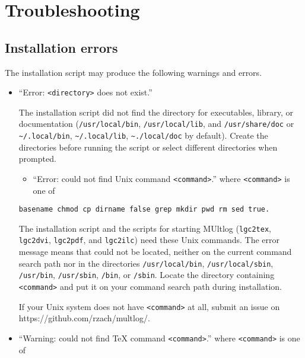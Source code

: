 \documentclass[]{article}
\providecommand{\tightlist}{%
  \setlength{\itemsep}{0pt}\setlength{\parskip}{0pt}}
\begin{document}
\hypertarget{troubleshooting}{%
\section{Troubleshooting}\label{troubleshooting}}

\hypertarget{installation-errors}{%
\subsection{Installation errors}\label{installation-errors}}

The installation script may produce the following warnings and errors.

\begin{itemize}
\item
  ``Error: \texttt{\textless{}directory\textgreater{}} does not exist.''

  The installation script did not find the directory for executables,
  library, or documentation (\texttt{/usr/local/bin},
  \texttt{/usr/local/lib}, and \texttt{/usr/share/doc} or
  \texttt{\textasciitilde{}/.local/bin},
  \texttt{\textasciitilde{}/.local/lib},
  \texttt{\textasciitilde{}./local/doc} by default). Create the
  directories before running the script or select different directories
  when prompted.

  \begin{itemize}
  \tightlist
  \item
    ``Error: could not find Unix command
    \texttt{\textless{}command\textgreater{}}.'' where
    \texttt{\textless{}command\textgreater{}} is one of
  \end{itemize}

\begin{verbatim}
basename chmod cp dirname false grep mkdir pwd rm sed true.
\end{verbatim}

  The installation script and the scripts for starting MUltlog
  (\texttt{lgc2tex}, \texttt{lgc2dvi}, \texttt{lgc2pdf}, and
  \texttt{lgc2ilc}) need these Unix commands. The error message means
  that could not be located, neither on the current command search path
  nor in the directories \texttt{/usr/local/bin},
  \texttt{/usr/local/sbin}, \texttt{/usr/bin}, \texttt{/usr/sbin},
  \texttt{/bin}, or \texttt{/sbin}. Locate the directory containing
  \texttt{\textless{}command\textgreater{}} and put it on your command
  search path during installation.

  If your Unix system does not have
  \texttt{\textless{}command\textgreater{}} at all, submit an issue on
  https://github.com/rzach/multlog/.
\item
  ``Warning: could not find TeX command
  \texttt{\textless{}command\textgreater{}}.'' where
  \texttt{\textless{}command\textgreater{}} is one of


\end{itemize}
\end{document}
